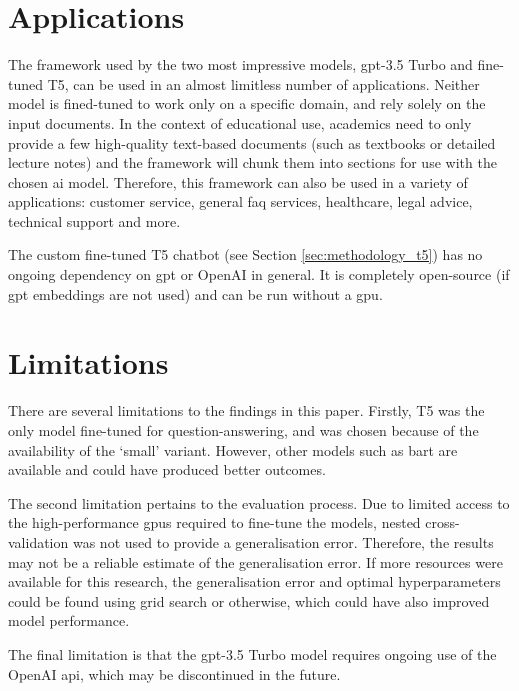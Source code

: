 \section{Applications}
The framework used by the two most impressive models, \acrshort{gpt}-3.5 Turbo and fine-tuned T5, can be used in an almost limitless number of applications. Neither model is fined-tuned to work only on a specific domain, and rely solely on the input documents. In the context of educational use, academics need to only provide a few high-quality text-based documents (such as textbooks or detailed lecture notes) and the framework will chunk them into sections for use with the chosen \acrshort{ai} model. Therefore, this framework can also be used in a variety of applications: customer service, general \acrshort{faq} services, healthcare, legal advice, technical support and more. 

The custom fine-tuned T5 chatbot (see Section \ref{sec:methodology_t5}) has no ongoing dependency on \acrshort{gpt} or OpenAI in general. It is completely open-source (if \acrshort{gpt} embeddings are not used) and can be run without a \acrshort{gpu}.

\section{Limitations}
There are several limitations to the findings in this paper. Firstly, T5 was the only model fine-tuned for question-answering, and was chosen because of the availability of the `small' variant. However, other models such as \acrshort{bart} are available and could have produced better outcomes.

The second limitation pertains to the evaluation process. Due to limited access to the high-performance \acrshort{gpu}s required to fine-tune the models, nested cross-validation was not used to provide a generalisation error. Therefore, the results may not be a reliable estimate of the generalisation error. If more resources were available for this research, the generalisation error and optimal hyperparameters could be found using grid search or otherwise, which could have also improved model performance.

The final limitation is that the \acrshort{gpt}-3.5 Turbo model requires ongoing use of the OpenAI \acrshort{api}, which may be discontinued in the future.